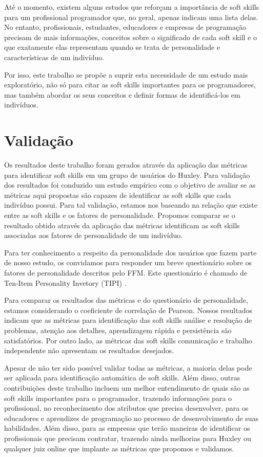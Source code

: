 Até o momento, existem alguns estudos que reforçam a importância de soft skills para um profissional programador que, no geral, apenas indicam uma lista delas. No entanto, profissionais, estudantes, educadores e empresas de programação precisam de mais informações, conceitos sobre o significado de cada soft skill e o que exatamente elas representam quando se trata de personalidade e características de um indivíduo.

Por isso, este trabalho se propõe a suprir esta necessidade de um estudo mais exploratório, não só para citar as soft skills importantes para os programadores, mas também abordar os seus conceitos e definir formas de identificá-los em indivíduos.

\section{Validação}

Os resultados deste trabalho foram gerados através da aplicação das métricas para identificar soft skills em um grupo de usuários do Huxley. Para validação dos resultados foi conduzido um estudo empírico com o objetivo de avaliar se as métricas aqui propostas são capazes de identificar as soft skills que cada indivíduo possui.
Para tal validação, estamos nos baseando na relação que existe entre as soft skills e os fatores de personalidade. Propomos comparar se o resultado obtido através da aplicação das métricas identificam as soft skills associadas aos fatores de personalidade de um indivíduo.

Para ter conhecimento a respeito da personalidade dos usuários que fazem parte de nosso estudo, os convidamos para responder um breve questionário sobre os fatores de personalidade descritos pelo FFM. Este questionário é chamado de Ten-Item Personality Invetory (TIPI) \cite{gosling:03}.

Para comparar os resultados das métricas e do questionário de personalidade, estamos considerando o coeficiente de correlação de Pearson. Nossos resultados indicam que as métricas para identificação das soft skills análise e resolução de problemas, atenção aos detalhes, aprendizagem rápida e persistência são satisfatórios. Por outro lado, as métricas das soft skills comunicação e trabalho independente não apresentam os resultados desejados. 

Apesar de não ter sido possível validar todas as métricas, a maioria delas pode ser aplicada para identificação automática de soft skills. Além disso, outras contribuições deste trabalho incluem um melhor entendimento de quais são as soft skills importantes para o programador, trazendo informações para o profissional, no reconhecimento dos atributos que precisa desenvolver, para os educadores e aprendizes de programação no processo de desenvolvimento de suas habilidades. Além disso, para as empresas que terão maneiras de identificar os profissionais que precisam contratar, trazendo ainda melhorias para Huxley ou qualquer juiz online que implante as métricas que propomos e validamos.

